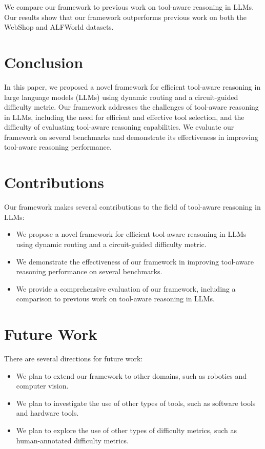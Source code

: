 \documentclass{article}
\begin{document}
We compare our framework to previous work on tool-aware reasoning in LLMs. Our results show that our framework outperforms previous work on both the WebShop and ALFWorld datasets.

\section{Conclusion}

In this paper, we proposed a novel framework for efficient tool-aware reasoning in large language models (LLMs) using dynamic routing and a circuit-guided difficulty metric. Our framework addresses the challenges of tool-aware reasoning in LLMs, including the need for efficient and effective tool selection, and the difficulty of evaluating tool-aware reasoning capabilities. We evaluate our framework on several benchmarks and demonstrate its effectiveness in improving tool-aware reasoning performance.

\section{Contributions}

Our framework makes several contributions to the field of tool-aware reasoning in LLMs:

\begin{itemize}
\item We propose a novel framework for efficient tool-aware reasoning in LLMs using dynamic routing and a circuit-guided difficulty metric.
\item We demonstrate the effectiveness of our framework in improving tool-aware reasoning performance on several benchmarks.
\item We provide a comprehensive evaluation of our framework, including a comparison to previous work on tool-aware reasoning in LLMs.
\end{itemize}

\section{Future Work}

There are several directions for future work:

\begin{itemize}
\item We plan to extend our framework to other domains, such as robotics and computer vision.
\item We plan to investigate the use of other types of tools, such as software tools and hardware tools.
\item We plan to explore the use of other types of difficulty metrics, such as human-annotated difficulty metrics.
\end{itemize}
\end{document}
